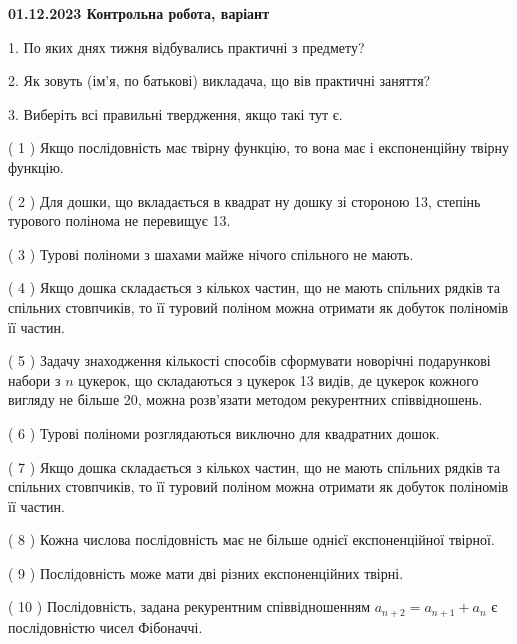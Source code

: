 \documentclass[12pt, ukrainian]{article}
\begin{document}
\vspace{4mm}
\newpage
\begin {large}

\textbf{01.12.2023 Контрольна робота, варіант  }\par


{
1. По яких днях тижня відбувались практичні з предмету?



\vspace{5mm}
2. Як зовуть (ім'я, по батькові) викладача, що вів практичні заняття?



\vspace{5mm}
3. Виберіть всі правильні твердження, якщо такі тут є.\par
\vspace{2mm}
( 1 ) Якщо послідовність має твірну функцію, то вона має і експоненційну твірну функцію.%

( 2 ) Для дошки, що вкладається в квадрат ну дошку зі стороною 13, степінь турового полінома не перевищує 13.%

( 3 ) Турові поліноми з шахами майже нічого спільного не мають.%

( 4 ) Якщо дошка складається з кількох частин, що не мають спільних рядків та спільних стовпчиків, то її туровий поліном можна отримати як добуток поліномів її частин.%

( 5 ) Задачу знаходження кількості способів сформувати новорічні подарункові набори з $n$ цукерок, що складаються з цукерок 13 видів, де цукерок кожного вигляду не більше 20, можна розв’язати методом рекурентних співвідношень.%

( 6 ) Турові поліноми розглядаються виключно для квадратних дошок.%

( 7 ) Якщо дошка складається з кількох частин, що не мають спільних рядків та спільних стовпчиків, то її туровий поліном можна отримати як добуток поліномів її частин.%

( 8 ) Кожна числова послідовність має не більше однієї  експоненційної твірної.%

( 9 ) Послідовність може мати дві різних експоненційних твірні.%

( 10 ) Послідовність, задана рекурентним співвідношенням $a_{n+2}=a_{n+1}+a_{n}$ є послідовністю чисел Фібоначчі.%
}
\end {large}
\end{document}
